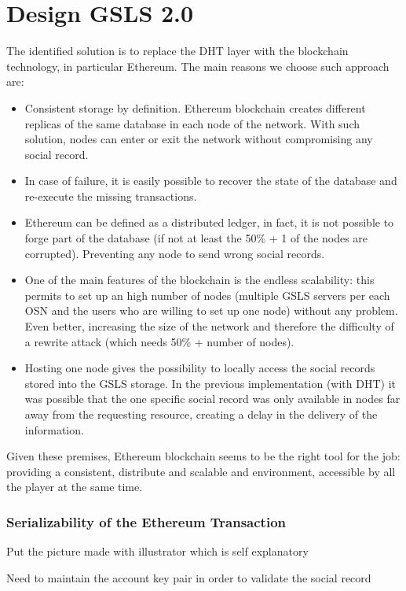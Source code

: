
\section{Design GSLS 2.0}

The identified solution is to replace the DHT layer with the blockchain technology, in particular Ethereum.
The main reasons we choose such approach are:

\begin{itemize}
  \item Consistent storage by definition. Ethereum blockchain creates different replicas of the same database in each node of the network. With such solution, nodes can enter or exit the network without compromising any social record.
  \item In case of failure, it is easily possible to recover the state of the database and re-execute the missing transactions.
  \item Ethereum can be defined as a distributed ledger, in fact, it is not possible to forge part of the database (if not at least the 50\% + 1 of the nodes are corrupted). Preventing any node to send wrong social records.
  \item One of the main features of the blockchain is the endless scalability: this permits to set up an high number of nodes (multiple GSLS servers per each OSN and the users who are willing to set up one node) without any problem.
  Even better, increasing the size of the network and therefore the difficulty of a rewrite attack (which needs 50\% + number of nodes).
  \item Hosting one node gives the possibility to locally access the social records stored into the GSLS storage. In the previous implementation (with DHT) it was possible that the one specific social record was only available in nodes far away from the requesting resource, creating a delay in the delivery of the information. 
\end{itemize}

Given these premises, Ethereum blockchain seems to be the right tool for the job: providing a consistent, distribute and scalable and environment, accessible by all the player at the same time.



\subsubsection{Serializability of the Ethereum Transaction}

Put the picture made with illustrator which is self explanatory


\begin{notation}
  Need to maintain the account key pair in order to validate the social record
\end{notation}